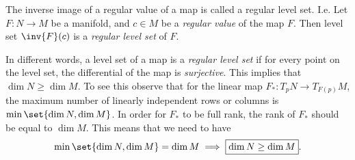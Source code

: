 \begin{definition}
	The inverse image of a regular value of a map is called a regular level set. I.e. Let $ F: N \to M $ be a manifold, and $ c \in M $ be a \emph{regular value} of the map $ F $. Then level set $  \inv{F}(c) $ is a \emph{regular level set} of $ F $.  
\end{definition}
\begin{remark}
	\label{remark:SurjectivityAndDimension}
	In different words, a level set of a map is a \emph{regular level set} if for every point on the level set, the differential of the map is \emph{surjective}. This implies that $ \dim N \geq \dim M $. To see this observe that for the linear map $ F_*: T_pN \to T_{F(p)}M $, the maximum number of linearly independent rows or columns is $ \min\set{\dim N, \dim M} $. In order for $ F_* $ to be full rank, the rank of $ F_* $  should be equal to $ \dim M $. This means that we need to have
	\[ \min\set{\dim N, \dim M} = \dim M \implies \boxed{\dim N \geq \dim M}. \]
\end{remark}

